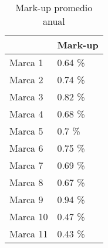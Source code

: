 \begin{table}
\centering
\caption{Mark-up promedio anual}
\begin{tabular}{ll}
\toprule
{} & Mark-up \\
\midrule
Marca 1  &  0.64 \% \\
Marca 2  &  0.74 \% \\
Marca 3  &  0.82 \% \\
Marca 4  &  0.68 \% \\
Marca 5  &   0.7 \% \\
Marca 6  &  0.75 \% \\
Marca 7  &  0.69 \% \\
Marca 8  &  0.67 \% \\
Marca 9  &  0.94 \% \\
Marca 10 &  0.47 \% \\
Marca 11 &  0.43 \% \\
\bottomrule
\end{tabular}
\end{table}
